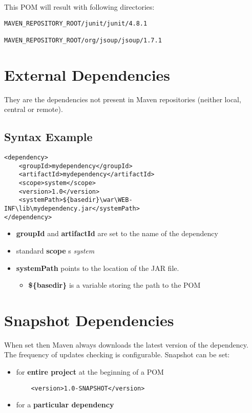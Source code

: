 \documentclass{report}
\begin{document}
This POM will result with following directories:
\begin{verbatim}
MAVEN_REPOSITORY_ROOT/junit/junit/4.8.1

MAVEN_REPOSITORY_ROOT/org/jsoup/jsoup/1.7.1
\end{verbatim}



\chapter{External Dependencies}
They are the dependencies not present in Maven repositories (neither local, central or remote).


\section{Syntax Example}
\begin{verbatim}
<dependency>
    <groupId>mydependency</groupId>
    <artifactId>mydependency</artifactId>
    <scope>system</scope>
    <version>1.0</version>
    <systemPath>${basedir}\war\WEB-INF\lib\mydependency.jar</systemPath>
</dependency>

\end{verbatim}

\begin{itemize}
	\item \textbf{groupId} and \textbf{artifactId} are set to the name of the dependency
	\item standard \textbf{scope} s \textit{system}
	\item \textbf{systemPath} points to the location of the JAR file.
	\begin{itemize}
		\item \textbf{\$\{basedir\}} is a variable storing the path to the POM
	\end{itemize}
\end{itemize}



\chapter{Snapshot Dependencies}
When set then Maven always downloads the latest version of the dependency. The frequency of updates checking is configurable.
Snapshot can be set:
\begin{itemize}
	\item for \textbf{entire project} at the beginning of a POM
	\begin{verbatim}
	<version>1.0-SNAPSHOT</version>
	\end{verbatim}
	
	\item for a \textbf{particular dependency}
\end{itemize}
\end{document}
